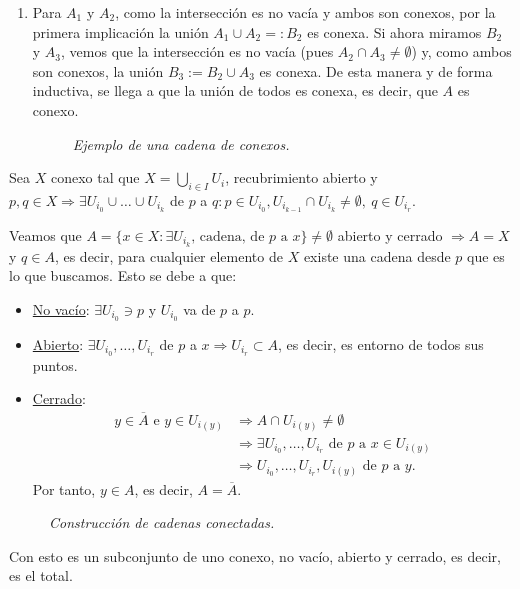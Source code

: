 \begin{demo}
\begin{enumerate}
\item Para $A_1$ y $A_2$, como la intersección es no vacía y ambos son conexos, por la primera implicación la unión $A_1 \cup A_2 =: B_2$ es conexa. Si ahora miramos $B_2$ y $A_3$, vemos que la intersección es no vacía (pues $A_2 \cap A_3\neq \emptyset$) y, como ambos son conexos, la unión $B_3 := B_2 \cup A_3$ es conexa. De esta manera y de forma inductiva, se llega a que la unión de todos es conexa, es decir, que $A$ es conexo.
\begin{figure}[H]
            \centering
            \caption{\textit{Ejemplo de una cadena de conexos.}}
            \label{fig:cadena-de-conexos}
\end{figure}
\end{enumerate}
\end{demo}

\begin{prop}
Sea $X$ conexo tal que $X = \bigcup_{i \in I} U_i$, recubrimiento abierto y $p, q \in X \Rightarrow \exists U_{i_0} \cup \ldots \cup U_{i_k}$ de $p$ a $q: p \in U_{i_0}, U_{i_{k - 1}} \cap U_{i_k} \neq \emptyset,\ q \in U_{i_r}$. 
\end{prop}
\begin{demo}
Veamos que $A = \{x \in X: \exists U_{i_k} \text{, cadena, de } p \text{ a } x\} \neq \emptyset$ abierto y cerrado $\Rightarrow A = X$ y $q \in A$, es decir, para cualquier elemento de $X$ existe una cadena desde $p$ que es lo que buscamos. Esto se debe a que: 
\begin{itemize}
    \item \underline{No vacío}: $\exists U_{i_0} \ni p$ y $U_{i_0}$ va de $p$ a $p$.
    \item \underline{Abierto}: $\exists U_{i_0}, \ldots, U_{i_r}$ de $p$ a $x \Rightarrow U_{i_r} \subset A$, es decir, es entorno de todos sus puntos.
    \item \underline{Cerrado}: 
    \begin{align*}
        y \in \overline{A} \text{ e } y \in U_{i\left( y \right)} &\Rightarrow A \cap U_{i\left( y \right)} \neq \emptyset\\
        &\Rightarrow \exists U_{i_0}, \ldots, U_{i_r} \text{ de } p \text{ a } x\in U_{i\left( y \right)}\\
        &\Rightarrow U_{i_0}, \ldots, U_{i_r}, U_{i\left( y \right)} \text{ de } p \text{ a } y
    .\end{align*}
    Por tanto, $y \in A$, es decir, $A = \overline{A}$.
\end{itemize}
\begin{figure}[H]
    \centering
    \caption{\textit{Construcción de cadenas conectadas.}}
    \label{fig:cadenas-conectadas}
\end{figure}
Con esto es un subconjunto de uno conexo, no vacío, abierto y cerrado, es decir, es el total.
\end{demo}

